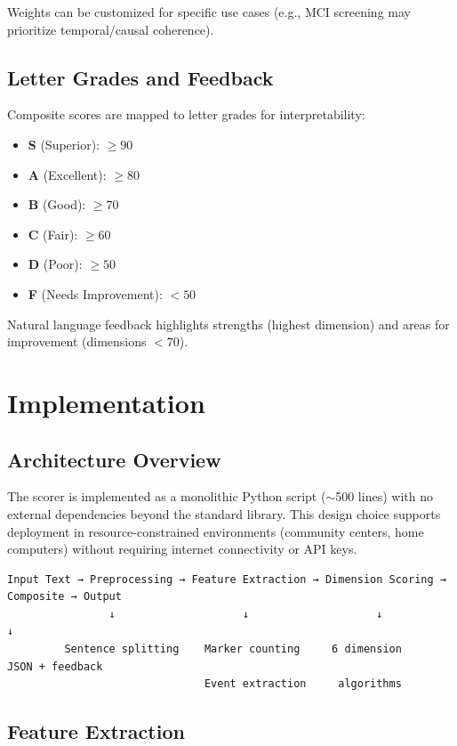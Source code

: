 \documentclass[11pt]{article}
\begin{document}
Weights can be customized for specific use cases (e.g., MCI screening may prioritize temporal/causal coherence).

\subsection{Letter Grades and Feedback}

Composite scores are mapped to letter grades for interpretability:
\begin{itemize}
    \item \textbf{S} (Superior): $\geq 90$
    \item \textbf{A} (Excellent): $\geq 80$
    \item \textbf{B} (Good): $\geq 70$
    \item \textbf{C} (Fair): $\geq 60$
    \item \textbf{D} (Poor): $\geq 50$
    \item \textbf{F} (Needs Improvement): $< 50$
\end{itemize}

Natural language feedback highlights strengths (highest dimension) and areas for improvement (dimensions $< 70$).

\section{Implementation}
\label{sec:implementation}

\subsection{Architecture Overview}

The scorer is implemented as a monolithic Python script ($\sim$500 lines) with no external dependencies beyond the standard library. This design choice supports deployment in resource-constrained environments (community centers, home computers) without requiring internet connectivity or API keys.

\begin{verbatim}
Input Text → Preprocessing → Feature Extraction → Dimension Scoring → Composite → Output
                ↓                    ↓                    ↓                 ↓
         Sentence splitting    Marker counting     6 dimension       JSON + feedback
                               Event extraction     algorithms
\end{verbatim}

\subsection{Feature Extraction}
\end{document}
